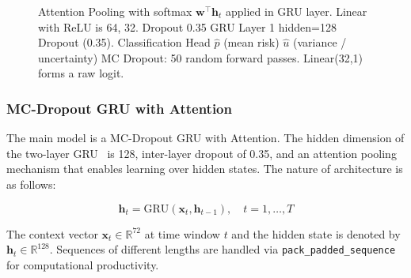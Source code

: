 \documentclass[conference]{IEEEtran}
\begin{document}
\begin{figure}[t]
\caption{Attention Pooling with softmax $\mathbf{w}^\top \mathbf{h}_t$ applied in GRU layer. Linear with ReLU is 64, 32. Dropout 0.35 GRU Layer 1 hidden=128 Dropout (0.35). Classification Head $\hat{p}$ (mean risk) $\hat{u}$ (variance / uncertainty) MC Dropout: 50 random forward passes. Linear(32,1) forms a raw logit.}
\label{fig:model_arch}
\end{figure}

\subsubsection{MC-Dropout GRU with Attention}
The main model is a MC-Dropout GRU with Attention. The hidden dimension of the two-layer GRU~\cite{Cho2014} is 128, inter-layer dropout of 0.35, and an attention pooling mechanism that enables learning over hidden states. The nature of architecture is as follows:

\begin{equation}
\mathbf{h}_t = \text{GRU}(\mathbf{x}_t, \mathbf{h}_{t-1}), \quad t = 1, \ldots, T
\end{equation}

The context vector $\mathbf{x}_t \in \mathbb{R}^{72}$ at time window $t$ and the hidden state is denoted by $\mathbf{h}_t \in \mathbb{R}^{128}$. Sequences of different lengths are handled via \texttt{pack\_padded\_sequence} for computational productivity.
\end{document}

